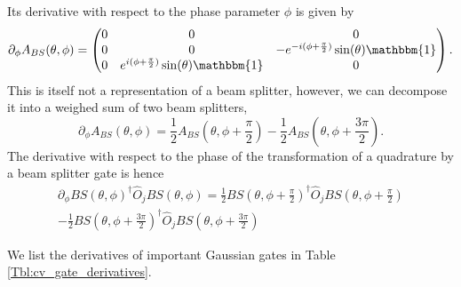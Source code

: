 \documentclass[aps,pra,10pt,twocolumn,groupedaddress,nofootinbib]{revtex4-1}
\theoremstyle{plain}
\begin{document}
Its derivative with respect to the phase parameter $\phi$ is given by
\[ 
	\partial_{\phi} A_{BS}(\theta, \phi) = 
	\begin{pmatrix} 0 & 0 & 0 \\ 
	0 & 0 & - e^{-i(\phi + \frac{\pi}{2})} \sin(\theta) \mathbbm{1}\\
	0 & e^{i(\phi + \frac{\pi}{2})}\sin(\theta) \mathbbm{1} & 0  
	\end{pmatrix}.
\]
This is itself not a representation of a beam splitter, however, we can decompose it into a weighed sum of two beam splitters, 
\[\partial_{\phi} A_{BS}(\theta, \phi) = \frac{1}{2}A_{BS}(\theta, \phi + \frac{\pi}{2}) - \frac{1}{2}A_{BS}(\theta, \phi + \frac{3\pi}{2}). \]
The derivative with respect to the phase of the transformation of a quadrature by a beam splitter gate is hence
\begin{multline} 
	\partial_{\phi} BS(\theta, \phi)^\dagger \hat{O}_j BS(\theta, \phi) =  \frac{1}{2} BS(\theta, \phi+ \frac{\pi}{2})^\dagger \hat{O}_j 	BS(\theta, \phi+ \frac{\pi}{2}) \\
	- \frac{1}{2} BS(\theta, \phi + \frac{3\pi}{2})^\dagger \hat{O}_j BS(\theta, \phi + \frac{3\pi}{2}) 
\end{multline}







We list the derivatives of important Gaussian gates in Table \ref{Tbl:cv_gate_derivatives}. \\
\end{document}
